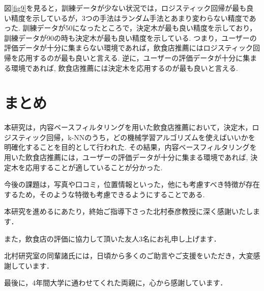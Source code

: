 \documentclass[12pt,a4j]{jreport}
\begin{document}
図\ref{fig9}を見ると，訓練データが少ない状況では，ロジスティック回帰が最も良い精度を示しているが，3つの手法はランダム手法とあまり変わらない精度であった.
訓練データが50になったところで，決定木が最も良い精度を示しており，訓練データが90の時も決定木が最も良い精度を示している.
つまり，ユーザーの評価データが十分に集まらない環境であれば，飲食店推薦にはロジスティック回帰を応用するのが最も良いと言える.
逆に，ユーザーの評価データが十分に集まる環境であれば, 飲食店推薦には決定木を応用するのが最も良いと言える.

\chapter{まとめ}

本研究は，内容ベースフィルタリングを用いた飲食店推薦において，決定木，ロジスティック回帰，k-NNのうち，どの機械学習アルゴリズムを使えばいいかを明確化することを目的として行われた.
その結果，内容ベースフィルタリングを用いた飲食店推薦には，ユーザーの評価データが十分に集まる環境であれば, 決定木を応用することが適していることが分かった.

今後の課題は，写真や口コミ，位置情報といった，他にも考慮すべき特徴が存在するため，そのような特徴も考慮できるようにすることである.

\appendix

\acknowledgement %

本研究を進めるにあたり，終始ご指導下さった北村泰彦教授に深く感謝いたします．

また，飲食店の評価に協力して頂いた友人3名にお礼申し上げます．

北村研究室の同輩諸氏には，日頃から多くのご助言やご支援をいただき，大変感謝しています．

最後に，4年間大学に通わせてくれた両親に，心から感謝しています．

\end{document}
